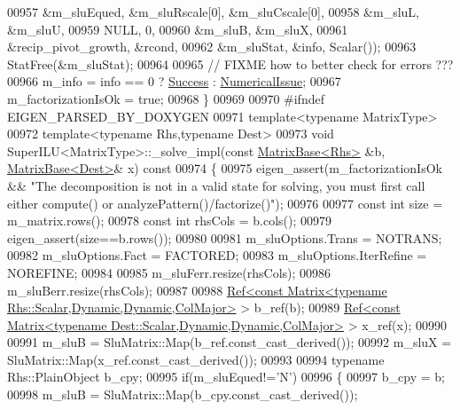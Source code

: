 \begin{DoxyCode}
00957                 &m\_sluEqued, &m\_sluRscale[0], &m\_sluCscale[0],
00958                 &m\_sluL, &m\_sluU,
00959                 NULL, 0,
00960                 &m\_sluB, &m\_sluX,
00961                 &recip\_pivot\_growth, &rcond,
00962                 &m\_sluStat, &info, Scalar());
00963   StatFree(&m\_sluStat);
00964 
00965   \textcolor{comment}{// FIXME how to better check for errors ???}
00966   m\_info = info == 0 ? \hyperlink{group__enums_gga85fad7b87587764e5cf6b513a9e0ee5ea52581b035f4b59c203b8ff999ef5fcea}{Success} : \hyperlink{group__enums_gga85fad7b87587764e5cf6b513a9e0ee5eaaf9b736d310a664e7729d163a035cc5f}{NumericalIssue};
00967   m\_factorizationIsOk = \textcolor{keyword}{true};
00968 \}
00969 
00970 \textcolor{preprocessor}{#ifndef EIGEN\_PARSED\_BY\_DOXYGEN}
00971 \textcolor{keyword}{template}<\textcolor{keyword}{typename} MatrixType>
00972 \textcolor{keyword}{template}<\textcolor{keyword}{typename} Rhs,\textcolor{keyword}{typename} Dest>
00973 \textcolor{keywordtype}{void} SuperILU<MatrixType>::\_solve\_impl(\textcolor{keyword}{const} \hyperlink{group___core___module_class_eigen_1_1_matrix_base}{MatrixBase<Rhs>} &b, 
      \hyperlink{group___core___module_class_eigen_1_1_matrix_base}{MatrixBase<Dest>}& x)\textcolor{keyword}{ const}
00974 \textcolor{keyword}{}\{
00975   eigen\_assert(m\_factorizationIsOk && \textcolor{stringliteral}{"The decomposition is not in a valid state for solving, you must
       first call either compute() or analyzePattern()/factorize()"});
00976 
00977   \textcolor{keyword}{const} \textcolor{keywordtype}{int} size = m\_matrix.rows();
00978   \textcolor{keyword}{const} \textcolor{keywordtype}{int} rhsCols = b.cols();
00979   eigen\_assert(size==b.rows());
00980 
00981   m\_sluOptions.Trans = NOTRANS;
00982   m\_sluOptions.Fact = FACTORED;
00983   m\_sluOptions.IterRefine = NOREFINE;
00984 
00985   m\_sluFerr.resize(rhsCols);
00986   m\_sluBerr.resize(rhsCols);
00987   
00988   \hyperlink{group___core___module_class_eigen_1_1_ref}{Ref<const Matrix<typename Rhs::Scalar,Dynamic,Dynamic,ColMajor>}
       > b\_ref(b);
00989   \hyperlink{group___core___module_class_eigen_1_1_ref}{Ref<const Matrix<typename Dest::Scalar,Dynamic,Dynamic,ColMajor>}
       > x\_ref(x);
00990   
00991   m\_sluB = SluMatrix::Map(b\_ref.const\_cast\_derived());
00992   m\_sluX = SluMatrix::Map(x\_ref.const\_cast\_derived());
00993 
00994   \textcolor{keyword}{typename} Rhs::PlainObject b\_cpy;
00995   \textcolor{keywordflow}{if}(m\_sluEqued!=\textcolor{charliteral}{'N'})
00996   \{
00997     b\_cpy = b;
00998     m\_sluB = SluMatrix::Map(b\_cpy.const\_cast\_derived());  

\end{DoxyCode}
